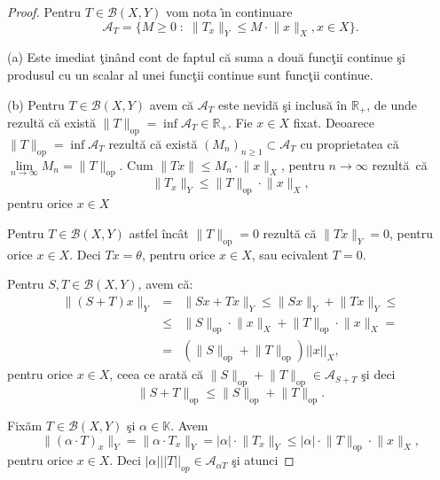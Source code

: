 \documentclass[ a4paper, 12pt]{report}
\theoremstyle{definition}
\theoremstyle{remark}
\numberwithin{equation}{section}
\begin{document}
\begin{proof}
Pentru $T \in \mathcal{B}(X,Y) $ vom nota \^\i n continuare
$$\mathcal{A}_T = \{M \geq 0 \; : \; \lVert  T_x \rVert_{Y} \leq M \cdot \lVert x \rVert_{X},x \in X\}.$$

(a) Este imediat \c tin\^ and cont de faptul c\u a suma a dou\u a func\c tii continue \c si produsul cu un scalar al unei func\c tii continue sunt func\c tii continue.

(b) Pentru $T \in \mathcal{B}(X,Y)$ avem c\u a $\mathcal{A}_T$ este nevid\u a \c si inclus\u a \^in $\mathbb{R}_{+}$, de unde rezult\u a c\u a exist\u a
$\lVert T \rVert_{\mbox{op}} = \inf \mathcal{A}_T \in \mathbb{R}_{+}$.
Fie $x \in X$ fixat.
Deoarece $\lVert T \rVert_{\mbox{op}} = \inf\mathcal{A}_T$ rezult\u a c\u a exist\u a $(M_n)_{n \geq 1} \subset \mathcal{A}_{T}$ cu proprietatea c\u a $\lim\limits_{n \rightarrow \infty} M_n = \lVert T \rVert_{\mbox{op}}$. Cum $\lVert Tx \rVert \leq M_n \cdot \lVert x\rVert_{X}$, pentru $n \longrightarrow \infty$ rezult\u a\  c\u a
$$\lVert T_x \rVert_{Y} \leq \lVert T \rVert_{\mbox{op}} \cdot \lVert x  \rVert_{X},$$ pentru orice $x \in X$

Pentru $T \in \mathcal{B}(X,Y)$ astfel \^inc\^at $\lVert T \rVert_{\mbox{op}} = 0$ rezult\u a c\u a $\lVert Tx \rVert_{Y} = 0$, pentru orice $x \in X$. Deci $Tx = \theta$, pentru orice $x \in X$, sau ecivalent $T = 0$.

Pentru $S, T \in \mathcal{B}(X,Y)$, avem c\u a:
\begin{eqnarray*}
\lVert (S+T){x} \rVert_{Y} &=& \lVert S{x}+T{x}  \rVert_{Y} \leq \lVert Sx \rVert_{Y} + \lVert Tx \rVert_{Y} \leq\\
&\leq& \lVert S  \rVert_{\mbox{op}} \cdot \lVert x \rVert_{X} + \lVert T \rVert_{\mbox{op}} \cdot \lVert x  \rVert_{X} =\\
&=& (\lVert S \rVert_{\mbox{op}} + \lVert T \rVert_{\mbox{op}})||x||_X,
\end{eqnarray*}
pentru orice $x \in X$, ceea ce arat\u a c\u a $\lVert S \rVert_{\mbox{op}} + \lVert T \rVert_{\mbox{op}} \in \mathcal{A}_{S+T}$ \c si deci
$$\lVert S+T  \rVert_{\mbox{op}} \leq \lVert S \rVert_{\mbox{op}} + \lVert T \rVert_{\mbox{op}}.$$

Fix\u am $T \in \mathcal{B}(X,Y)$ \c si  $\alpha \in \mathbb{K}.$ Avem
$$\lVert (\alpha \cdot T )_x\rVert_{Y} = \lVert \alpha \cdot T_x  \rVert_{Y} = \lvert \alpha \rvert \cdot \lVert T_x \rVert_{Y} \leq \lvert \alpha \rvert \cdot \lVert T \rVert_{\mbox{op}} \cdot \lVert x \rVert_{X},$$ pentru orice $x \in X$. Deci $|\alpha| ||T||_{op} \in \mathcal{A}_{\alpha T}$ \c si atunci


\end{proof}
\end{document}
